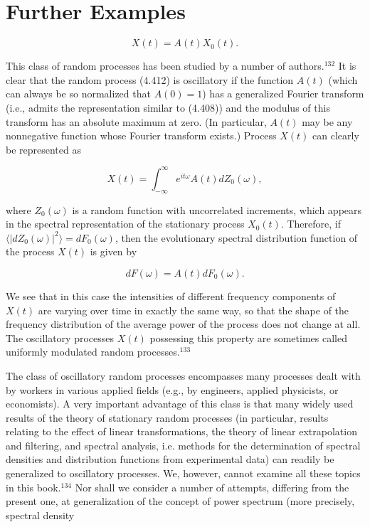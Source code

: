 \documentclass{article}
\begin{document}
\section{Further Examples}

\begin{equation}
X(t) = A(t)X_0(t).
\end{equation}

This class of random processes has been studied by a number of authors.$^{132}$ It is clear that the random process (4.412) is oscillatory if the function $A(t)$ (which can always be so normalized that $A(0) = 1$) has a generalized Fourier transform (i.e., admits the representation similar to (4.408)) and the modulus of this transform has an absolute maximum at zero. (In particular, $A(t)$ may be any nonnegative function whose Fourier transform exists.) Process $X(t)$ can clearly be represented as

\begin{equation}
X(t) = \int_{-\infty}^{\infty} e^{it\omega}A(t)dZ_0(\omega),
\end{equation}

where $Z_0(\omega)$ is a random function with uncorrelated increments, which appears in the spectral representation of the stationary process $X_0(t)$. Therefore, if $\langle |dZ_0(\omega)|^2 \rangle = dF_0(\omega)$, then the evolutionary spectral distribution function of the process $X(t)$ is given by

\begin{equation}
dF(\omega) = A(t)dF_0(\omega).
\end{equation}

We see that in this case the intensities of different frequency components of $X(t)$ are varying over time in exactly the same way, so that the shape of the frequency distribution of the average power of the process does not change at all. The oscillatory processes $X(t)$ possessing this property are sometimes called uniformly modulated random processes.$^{133}$

The class of oscillatory random processes encompasses many processes dealt with by workers in various applied fields (e.g., by engineers, applied physicists, or economists). A very important advantage of this class is that many widely used results of the theory of stationary random processes (in particular, results relating to the effect of linear transformations, the theory of linear extrapolation and filtering, and spectral analysis, i.e. methods for the determination of spectral densities and distribution functions from experimental data) can readily be generalized to oscillatory processes. We, however, cannot examine all these topics in this book.$^{134}$ Nor shall we consider a number of attempts, differing from the present one, at generalization of the concept of power spectrum (more precisely, spectral density
\end{document}
